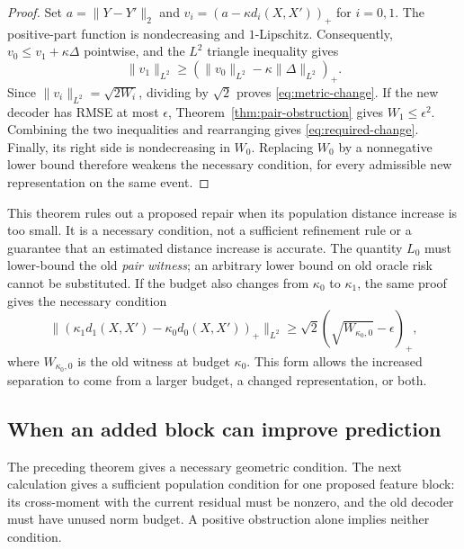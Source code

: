 \begin{proof}
Set $a=\|Y-Y'\|_2$ and
$v_i=(a-\kappa d_i(X,X'))_+$ for $i=0,1$. The positive-part function
is nondecreasing and $1$-Lipschitz. Consequently,
$v_0\leq v_1+\kappa\Delta$ pointwise, and the $L^2$ triangle inequality
gives
\[
 \|v_1\|_{L^2}\geq
       (\|v_0\|_{L^2}-\kappa\|\Delta\|_{L^2})_+.
\]
Since $\|v_i\|_{L^2}=\sqrt{2W_i}$, dividing by $\sqrt2$ proves
\eqref{eq:metric-change}. If the new decoder has RMSE at most $\epsilon$,
Theorem~\ref{thm:pair-obstruction} gives $W_1\leq\epsilon^2$.
Combining the two inequalities and rearranging gives
\eqref{eq:required-change}. Finally, its right side is nondecreasing in
$W_0$. Replacing $W_0$ by a nonnegative lower bound therefore weakens
the necessary condition, for every admissible new representation on the
same event.
\end{proof}

This theorem rules out a proposed repair when its population distance
increase is too small. It is a necessary condition, not a sufficient
refinement rule or a guarantee that an estimated distance increase is
accurate. The quantity $L_0$ must lower-bound the old \emph{pair witness};
an arbitrary lower bound on old oracle risk cannot be substituted.
If the budget also changes from $\kappa_0$ to $\kappa_1$, the same proof
gives the necessary condition
\[
 \bigl\|(\kappa_1d_1(X,X')-\kappa_0d_0(X,X'))_+\bigr\|_{L^2}
 \geq\sqrt2(\sqrt{W_{\kappa_0,0}}-\epsilon)_+,
\]
where $W_{\kappa_0,0}$ is the old witness at budget $\kappa_0$.
This form allows the increased separation to come from a larger budget,
a changed representation, or both.

\subsection{When an added block can improve prediction}

The preceding theorem gives a necessary geometric condition. The next
calculation gives a sufficient population condition for one proposed
feature block: its cross-moment with the current residual must be nonzero,
and the old decoder must have unused norm budget. A positive obstruction
alone implies neither condition.

